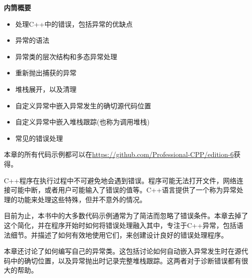 \noindent
\textbf{内筒概要}

\begin{itemize}
\item
处理C++中的错误，包括异常的优缺点

\item
异常的语法

\item
异常类的层次结构和多态异常处理

\item
重新抛出捕获的异常

\item
堆栈展开，以及清理

\item
自定义异常中嵌入异常发生的确切源代码位置

\item
自定义异常中嵌入堆栈跟踪(也称为调用堆栈)

\item
常见的错误处理
\end{itemize}

本章的所有代码示例都可以在\url{https://github.com/Professional-CPP/edition-6}获得。

C++程序在执行过程中不可避免地会遇到错误。程序可能无法打开文件，网络连接可能中断，或者用户可能输入了错误的值等。C++语言提供了一个称为异常处理的功能来处理这些特殊，但并不意外的情况。

目前为止，本书中的大多数代码示例通常为了简洁而忽略了错误条件。本章去掉了这个简化，并在程序开始时如何将错误处理融入其中，专注于C++异常，包括语法细节。并描述了如何有效地使用它们，来创建设计良好的错误处理程序。

本章还讨论了如何编写自己的异常类。这包括讨论如何自动嵌入异常发生时在源代码中的确切位置，以及异常抛出时记录完整堆栈跟踪。这两者对于诊断错误都有很大的帮助。













